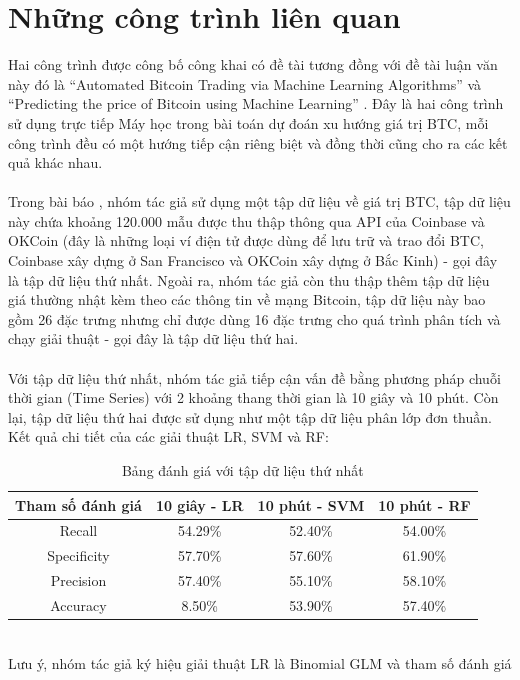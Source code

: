 \chapter{Những công trình liên quan}
Hai công trình được công bố công khai có đề tài tương đồng với đề tài luận văn này đó là 
``Automated Bitcoin Trading via Machine Learning Algorithms'' \cite{AutomatedBitcoinTrading}
và ``Predicting the price of Bitcoin using Machine Learning'' \cite{PredictingThePriceOfBitcoin}.
Đây là hai công trình sử dụng trực tiếp Máy học trong bài toán dự đoán xu hướng 
giá trị BTC, mỗi công trình đều có một hướng tiếp cận riêng biệt và đồng thời 
cũng cho ra các kết quả khác nhau.\\\\
Trong bài báo \cite{AutomatedBitcoinTrading}, nhóm tác giả sử dụng một tập dữ 
liệu về giá trị BTC, tập dữ liệu này chứa khoảng 120.000 mẫu được thu thập thông 
qua API của Coinbase và OKCoin (đây là những loại ví điện tử được dùng để lưu 
trữ và trao đổi BTC, Coinbase xây dựng ở San Francisco và OKCoin xây dựng ở Bắc 
Kinh) - gọi đây là tập dữ liệu thứ nhất. Ngoài ra, nhóm tác giả còn thu thập 
thêm tập dữ liệu giá thường nhật kèm theo các thông tin về mạng Bitcoin, tập dữ 
liệu này bao gồm 26 đặc trưng nhưng chỉ được dùng 16 đặc trưng cho quá trình 
phân tích và chạy giải thuật - gọi đây là tập dữ liệu thứ hai.\\\\
Với tập dữ liệu thứ nhất, nhóm tác giả tiếp cận vấn đề bằng phương pháp chuỗi 
thời gian (Time Series) với 2 khoảng thang thời gian là 10 giây và 10 phút. Còn 
lại, tập dữ liệu thứ hai được sử dụng như một tập dữ liệu phân lớp đơn thuần.
Kết quả chi tiết của các giải thuật LR, SVM và RF:
\begin{table}[h]
\centering
\begin{tabular}{ |c|c|c|c| }
\hline
Tham số đánh giá & 10 giây - LR & 10 phút - SVM & 10 phút - RF \\
\hline
Recall & 54.29\% & 52.40\% & 54.00\% \\
\hline
Specificity & 57.70\% & 57.60\% & 61.90\% \\
\hline
Precision & 57.40\% & 55.10\% & 58.10\% \\
\hline
Accuracy & 8.50\% & 53.90\% & 57.40\% \\
\hline
\end{tabular}
\caption{Bảng đánh giá với tập dữ liệu thứ nhất}
\end{table}\\
Lưu ý, nhóm tác giả ký hiệu giải thuật LR là Binomial GLM và tham số đánh giá 
